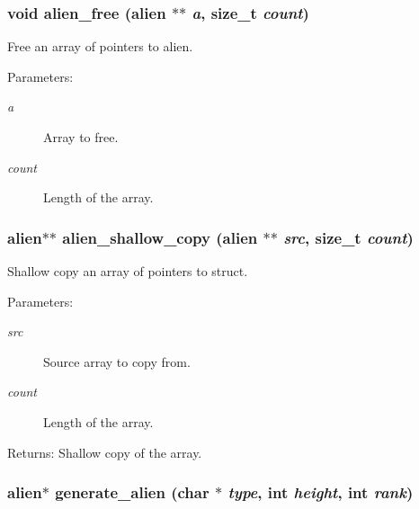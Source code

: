 \subsubsection{\setlength{\rightskip}{0pt plus 5cm}void alien\_\-free (\bf{alien} $\ast$$\ast$ {\em a}, size\_\-t {\em count})}\label{struct_8h_aeff06edf6a2f1d6e3ccd814b2c2f846}


Free an array of pointers to alien. 

\begin{Desc}
\item[Parameters:]
\begin{description}
\item[{\em a}]Array to free. \item[{\em count}]Length of the array. \end{description}
\end{Desc}
\subsubsection{\setlength{\rightskip}{0pt plus 5cm}\bf{alien}$\ast$$\ast$ alien\_\-shallow\_\-copy (\bf{alien} $\ast$$\ast$ {\em src}, size\_\-t {\em count})}\label{struct_8h_bd50f4a20ff4aba4bf09d382940ac130}


Shallow copy an array of pointers to struct. 

\begin{Desc}
\item[Parameters:]
\begin{description}
\item[{\em src}]Source array to copy from. \item[{\em count}]Length of the array. \end{description}
\end{Desc}
\begin{Desc}
\item[Returns:]Shallow copy of the array. \end{Desc}
\subsubsection{\setlength{\rightskip}{0pt plus 5cm}\bf{alien}$\ast$ generate\_\-alien (char $\ast$ {\em type}, int {\em height}, int {\em rank})}\label{struct_8h_ed439d27d4e904f0b6fe86638dcb1589}


